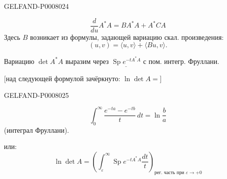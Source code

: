 \begin{GelfandAdjacentEvidence}{GELFAND-P000802}{4}

\begin{equation*}
\frac{d}{du}A^*A=BA^*A+A^*CA
\tag{18}
\end{equation*}
Здесь \(B\) возникает из формулы, задающей вариацию скал. произведения:
\begin{equation*}
(u,v)=\langle u,v\rangle+\langle Bu,v\rangle.
\tag{19}
\end{equation*}

Вариацию \(\det A^*A\) выразим через
\(\underline{\operatorname{Sp}e^{-tA^*A}}\) с пом. интегр. Фруллани.

[над следующей формулой зачёркнуто: \sout{\(\ln\det A=\)}]
\end{GelfandAdjacentEvidence}
\begin{GelfandAdjacentEvidence}{GELFAND-P000802}{5}

\begin{equation*}
\int_0^\infty\frac{e^{-ta}-e^{-tb}}{t}\,dt=\ln\frac ba
\tag{20}
\end{equation*}
(интеграл Фруллани).

или:
\begin{equation*}
\ln\det A=
\left(\int_\varepsilon^\infty\operatorname{Sp}e^{-tA^*A}\frac{dt}{t}\right)_{\text{рег. часть при }\varepsilon\to+0}
\tag{21}
\end{equation*}
\end{GelfandAdjacentEvidence}



